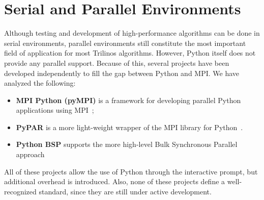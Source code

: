 \documentclass[acmtocl]{acmtrans2m}
\begin{document}
\section{Serial and Parallel Environments}
\label{sec:serial}

Although testing and development of high-performance algorithms can be
done in serial environments, parallel environments still constitute
the most important field of application for most Trilinos algorithms.
However, Python itself does not provide any parallel support.  Because
of this, several projects have been developed independently to fill
the gap between Python and MPI.  We have analyzed the following:

\begin{itemize}

\item {\bf MPI Python (pyMPI)} is a framework for developing parallel
  Python applications using MPI~\cite{MPI-Python};

\item {\bf PyPAR} is a more light-weight wrapper of the MPI library
  for Python~\cite{pypar}.

\item {\bf Python BSP} supports the more high-level Bulk Synchronous
  Parallel approach~\cite{bsp}

\end{itemize}

All of these projects allow the use of Python through the interactive
prompt, but additional overhead is introduced.  Also, none of these
projects define a well-recognized standard, since they are still under
active development.
\end{document}
